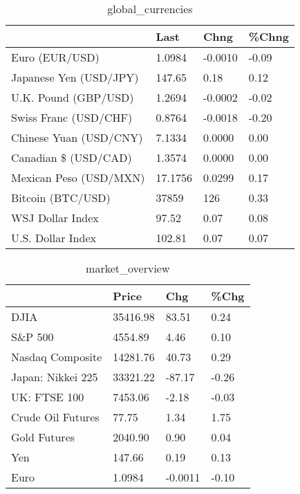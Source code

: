 \documentclass{article}%
\begin{document}
%


\begin{table}[htbp]%
\caption{global\_currencies}%
\centering%
\begin{adjustbox}{width=1\textwidth}%
\begin{tabular}{llll}
\toprule
                       &    Last &    Chng & \%Chng \\
\midrule
        Euro (EUR/USD) &  1.0984 & -0.0010 & -0.09 \\
Japanese Yen (USD/JPY) &  147.65 &    0.18 &  0.12 \\
  U.K. Pound (GBP/USD) &  1.2694 & -0.0002 & -0.02 \\
 Swiss Franc (USD/CHF) &  0.8764 & -0.0018 & -0.20 \\
Chinese Yuan (USD/CNY) &  7.1334 &  0.0000 &  0.00 \\
  Canadian \$ (USD/CAD) &  1.3574 &  0.0000 &  0.00 \\
Mexican Peso (USD/MXN) & 17.1756 &  0.0299 &  0.17 \\
     Bitcoin (BTC/USD) &   37859 &     126 &  0.33 \\
      WSJ Dollar Index &   97.52 &    0.07 &  0.08 \\
     U.S. Dollar Index &  102.81 &    0.07 &  0.07 \\
\bottomrule
\end{tabular}
%
\end{adjustbox}%
\end{table}

%


\begin{table}[htbp]%
\caption{market\_overview}%
\centering%
\begin{adjustbox}{width=1\textwidth}%
\begin{tabular}{llll}
\toprule
                  &    Price &     Chg &  \%Chg \\
\midrule
             DJIA & 35416.98 &   83.51 &  0.24 \\
          S\&P 500 &  4554.89 &    4.46 &  0.10 \\
 Nasdaq Composite & 14281.76 &   40.73 &  0.29 \\
Japan: Nikkei 225 & 33321.22 &  -87.17 & -0.26 \\
     UK: FTSE 100 &  7453.06 &   -2.18 & -0.03 \\
Crude Oil Futures &    77.75 &    1.34 &  1.75 \\
     Gold Futures &  2040.90 &    0.90 &  0.04 \\
              Yen &   147.66 &    0.19 &  0.13 \\
             Euro &   1.0984 & -0.0011 & -0.10 \\
\bottomrule
\end{tabular}
%
\end{adjustbox}%
\end{table}

%
\end{document}
